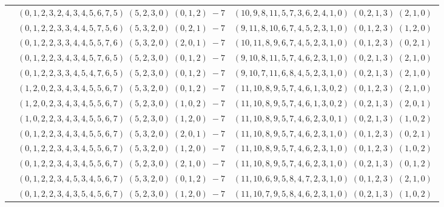 \documentclass[11pt]{article}
\begin{document}
\begin{longtable}[l]{|c|c|c|}
 \cline{2-3} 
 & $(0 ,1 ,2 ,3 ,2 ,4 ,3 ,4 ,5 ,6 ,7 ,5) \;(5 ,2 ,3 ,0) \;(0 ,1 ,2) \;-7$ & $(10 ,9 ,8 ,11 ,5 ,7 ,3 ,6 ,2 ,4 ,1 ,0) \;(0 ,2 ,1 ,3) \;(2 ,1 ,0) \;$\\ 
 \cline{2-3} 
 & $(0 ,1 ,2 ,2 ,3 ,3 ,4 ,4 ,5 ,7 ,5 ,6) \;(5 ,3 ,2 ,0) \;(0 ,2 ,1) \;-7$ & $(9 ,11 ,8 ,10 ,6 ,7 ,4 ,5 ,2 ,3 ,1 ,0) \;(0 ,1 ,2 ,3) \;(1 ,2 ,0) \;$\\ 
 \cline{2-3} 
 & $(0 ,1 ,2 ,2 ,3 ,3 ,4 ,4 ,5 ,5 ,7 ,6) \;(5 ,3 ,2 ,0) \;(2 ,0 ,1) \;-7$ & $(10 ,11 ,8 ,9 ,6 ,7 ,4 ,5 ,2 ,3 ,1 ,0) \;(0 ,1 ,2 ,3) \;(0 ,2 ,1) \;$\\ 
 \cline{2-3} 
 & $(0 ,1 ,2 ,2 ,3 ,4 ,3 ,4 ,5 ,7 ,6 ,5) \;(5 ,2 ,3 ,0) \;(0 ,1 ,2) \;-7$ & $(9 ,10 ,8 ,11 ,5 ,7 ,4 ,6 ,2 ,3 ,1 ,0) \;(0 ,2 ,1 ,3) \;(2 ,1 ,0) \;$\\ 
 \cline{2-3} 
 & $(0 ,1 ,2 ,2 ,3 ,3 ,4 ,5 ,4 ,7 ,6 ,5) \;(5 ,2 ,3 ,0) \;(0 ,1 ,2) \;-7$ & $(9 ,10 ,7 ,11 ,6 ,8 ,4 ,5 ,2 ,3 ,1 ,0) \;(0 ,2 ,1 ,3) \;(2 ,1 ,0) \;$\\ 
 \cline{2-3} 
 & $(1 ,2 ,0 ,2 ,3 ,4 ,3 ,4 ,5 ,5 ,6 ,7) \;(5 ,3 ,2 ,0) \;(0 ,1 ,2) \;-7$ & $(11 ,10 ,8 ,9 ,5 ,7 ,4 ,6 ,1 ,3 ,0 ,2) \;(0 ,1 ,2 ,3) \;(2 ,1 ,0) \;$\\ 
 \cline{2-3} 
 & $(1 ,2 ,0 ,2 ,3 ,4 ,3 ,4 ,5 ,5 ,6 ,7) \;(5 ,2 ,3 ,0) \;(1 ,0 ,2) \;-7$ & $(11 ,10 ,8 ,9 ,5 ,7 ,4 ,6 ,1 ,3 ,0 ,2) \;(0 ,2 ,1 ,3) \;(2 ,0 ,1) \;$\\ 
 \cline{2-3} 
 & $(1 ,0 ,2 ,2 ,3 ,4 ,3 ,4 ,5 ,5 ,6 ,7) \;(5 ,2 ,3 ,0) \;(1 ,2 ,0) \;-7$ & $(11 ,10 ,8 ,9 ,5 ,7 ,4 ,6 ,2 ,3 ,0 ,1) \;(0 ,2 ,1 ,3) \;(1 ,0 ,2) \;$\\ 
 \cline{2-3} 
 & $(0 ,1 ,2 ,2 ,3 ,4 ,3 ,4 ,5 ,5 ,6 ,7) \;(5 ,3 ,2 ,0) \;(2 ,0 ,1) \;-7$ & $(11 ,10 ,8 ,9 ,5 ,7 ,4 ,6 ,2 ,3 ,1 ,0) \;(0 ,1 ,2 ,3) \;(0 ,2 ,1) \;$\\ 
 \cline{2-3} 
 & $(0 ,1 ,2 ,2 ,3 ,4 ,3 ,4 ,5 ,5 ,6 ,7) \;(5 ,3 ,2 ,0) \;(1 ,2 ,0) \;-7$ & $(11 ,10 ,8 ,9 ,5 ,7 ,4 ,6 ,2 ,3 ,1 ,0) \;(0 ,1 ,2 ,3) \;(1 ,0 ,2) \;$\\ 
 \cline{2-3} 
 & $(0 ,1 ,2 ,2 ,3 ,4 ,3 ,4 ,5 ,5 ,6 ,7) \;(5 ,2 ,3 ,0) \;(2 ,1 ,0) \;-7$ & $(11 ,10 ,8 ,9 ,5 ,7 ,4 ,6 ,2 ,3 ,1 ,0) \;(0 ,2 ,1 ,3) \;(0 ,1 ,2) \;$\\ 
 \cline{2-3} 
 & $(0 ,1 ,2 ,2 ,3 ,4 ,5 ,3 ,4 ,5 ,6 ,7) \;(5 ,3 ,2 ,0) \;(0 ,1 ,2) \;-7$ & $(11 ,10 ,6 ,9 ,5 ,8 ,4 ,7 ,2 ,3 ,1 ,0) \;(0 ,1 ,2 ,3) \;(2 ,1 ,0) \;$\\ 
 \cline{2-3} 
 & $(0 ,1 ,2 ,2 ,3 ,4 ,3 ,5 ,4 ,5 ,6 ,7) \;(5 ,2 ,3 ,0) \;(1 ,2 ,0) \;-7$ & $(11 ,10 ,7 ,9 ,5 ,8 ,4 ,6 ,2 ,3 ,1 ,0) \;(0 ,2 ,1 ,3) \;(1 ,0 ,2) \;$\\ 

\end{longtable}
\end{document}

